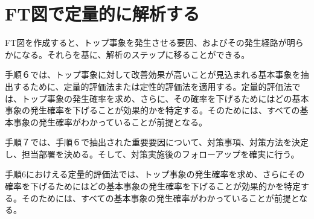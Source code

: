 \section{FT図で定量的に解析する}
FT図を作成すると、トップ事象を発生させる要因、およびその発生経路が明らかになる。それらを基に、解析のステップに移ることができる。

手順６では、トップ事象に対して改善効果が高いことが見込まれる基本事象を抽出するために、定量的評価法または定性的評価法を適用する。定量的評価法では、トップ事象の発生確率を求め、さらに、その確率を下げるためにはどの基本事象の発生確率を下げることが効果的かを特定する。そのためには、すべての基本事象の発生確率がわかっていることが前提となる。

手順７では、手順６で抽出された重要要因について、対策事項、対策方法を決定し、担当部署を決める。そして、対策実施後のフォローアップを確実に行う。

手順6におけえる定量的評価法では、トップ事象の発生確率を求め、さらにその確率を下げるためにはどの基本事象の発生確率を下げることが効果的かを特定する。そのためには、すべての基本事象の発生確率がわかっていることが前提となる。
\renewcommand{\labelenumi}{(\roman{enumi})}


